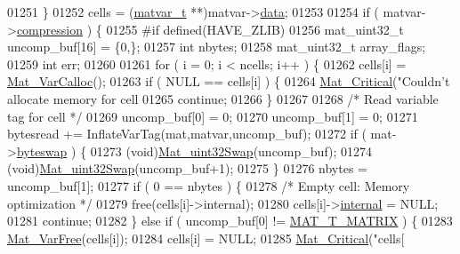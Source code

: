 \begin{DoxyCode}
{{{{{01251     \}
01252     cells = (\hyperlink{group___m_a_t_structmatvar__t}{matvar\_t} **)matvar->\hyperlink{group___m_a_t_a5672978efa230bbdecdf38ede781f7fa}{data};
01253 
01254     if ( matvar->\hyperlink{group___m_a_t_aeef0466048621cb2c959ba7f6c774d06}{compression} ) \{
01255 \textcolor{preprocessor}{#if defined(HAVE\_ZLIB)}
01256         mat\_uint32\_t uncomp\_buf[16] = \{0,\};
01257         \textcolor{keywordtype}{int} nbytes;
01258         mat\_uint32\_t array\_flags;
01259         \textcolor{keywordtype}{int} err;
01260 
01261         \textcolor{keywordflow}{for} ( i = 0; i < ncells; i++ ) \{
01262             cells[i] = \hyperlink{group___m_a_t_gae7c9c3699f6e9c31a9c490300013098c}{Mat\_VarCalloc}();
01263             \textcolor{keywordflow}{if} ( NULL == cells[i] ) \{
01264                 \hyperlink{group__mat__util_gaf51f2bfbb5580f575e4dd79757e2b80c}{Mat\_Critical}(\textcolor{stringliteral}{"Couldn't allocate memory for cell %
01265                 \textcolor{keywordflow}{continue};
01266             \}
01267 
01268             \textcolor{comment}{/* Read variable tag for cell */}
01269             uncomp\_buf[0] = 0;
01270             uncomp\_buf[1] = 0;
01271             bytesread += InflateVarTag(mat,matvar,uncomp\_buf);
01272             \textcolor{keywordflow}{if} ( mat->\hyperlink{struct__mat__t_a99d207977af5e04941ace56d71817a40}{byteswap} ) \{
01273                 (void)\hyperlink{endian_8c_a8cb0d0750e2eaf9840d95db531934f4f}{Mat\_uint32Swap}(uncomp\_buf);
01274                 (void)\hyperlink{endian_8c_a8cb0d0750e2eaf9840d95db531934f4f}{Mat\_uint32Swap}(uncomp\_buf+1);
01275             \}
01276             nbytes = uncomp\_buf[1];
01277             \textcolor{keywordflow}{if} ( 0 == nbytes ) \{
01278                 \textcolor{comment}{/* Empty cell: Memory optimization */}
01279                 free(cells[i]->\textcolor{keyword}{internal});
01280                 cells[i]->\hyperlink{group___m_a_t_a6e97e3ed9f40c49322c18561c2a94e92}{internal} = NULL;
01281                 \textcolor{keywordflow}{continue};
01282             \} \textcolor{keywordflow}{else} \textcolor{keywordflow}{if} ( uncomp\_buf[0] != \hyperlink{group___m_a_t_ggacf7b3b879282b7ab3a51190e49bf3453a32985fee89a4df8db4b3f5d3a48823d3}{MAT\_T\_MATRIX} ) \{
01283                 \hyperlink{group___m_a_t_ga1d14716f7450530fd1c9d02413787f0e}{Mat\_VarFree}(cells[i]);
01284                 cells[i] = NULL;
01285                 \hyperlink{group__mat__util_gaf51f2bfbb5580f575e4dd79757e2b80c}{Mat\_Critical}(\textcolor{stringliteral}{"cells[%
}}}}}}}
\end{DoxyCode}
